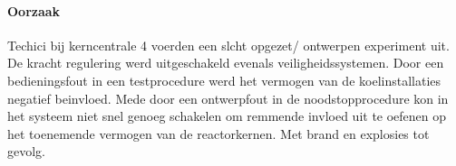 \documentclass{article}
\begin{document}
	\paragraph{Oorzaak}
	\newline \indent

	Techici bij kerncentrale 4 voerden een slcht opgezet/ ontwerpen experiment uit. De  kracht regulering werd uitgeschakeld evenals veiligheidssystemen. 
	Door een bedieningsfout in een testprocedure werd het vermogen van de koelinstallaties negatief beinvloed. Mede door een ontwerpfout in de noodstopprocedure kon in het systeem niet snel genoeg schakelen om remmende invloed uit te oefenen op het toenemende vermogen van de reactorkernen. Met brand en explosies tot gevolg.
	\cite{rivmTjernobyl}
	\cite{andereTijdenTjernobyl}
	\cite{kingskey19042022tjernobyl}
	\cite{erikbork26042023reactor4}
	\cite{nosTjernobyl30jaarlater}
\end{document}
